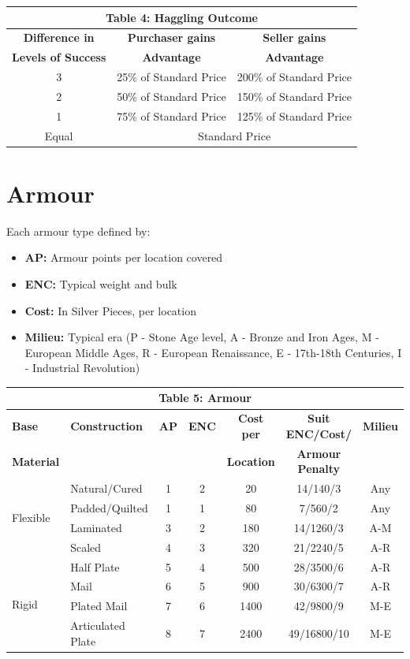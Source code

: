 \documentclass[10pt]{article}
\begin{document}
\begin{longtable}[c]{|c|c|c|}
\hline
\multicolumn{3}{|c|}{\textbf{Table 4: Haggling Outcome}} \\
\hline
\textbf{Difference in} & \textbf{Purchaser gains} & \textbf{Seller gains} \\
\textbf{Levels of Success} & \textbf{Advantage} & \textbf{Advantage} \\
\hline
3 & 25\% of Standard Price & 200\% of Standard Price \\
\hline
2 & 50\% of Standard Price & 150\% of Standard Price \\
\hline
1 & 75\% of Standard Price & 125\% of Standard Price \\
\hline
Equal & \multicolumn{2}{c|}{Standard Price} \\
\hline
\end{longtable}


\section{Armour}
\label{sec:armour}

Each armour type defined by:
\begin{itemize}
    \item \textbf{AP:} Armour points per location covered
    \item \textbf{ENC:} Typical weight and bulk 
    \item \textbf{Cost:} In Silver Pieces, per location
    \item \textbf{Milieu:} Typical era (P - Stone Age level, A - Bronze and Iron Ages, M - European Middle Ages, R - European Renaissance, E - 17th-18th Centuries, I - Industrial Revolution)
\end{itemize}

\begin{longtable}[c]{|l|l|c|c|c|c|c|}
\hline
\multicolumn{7}{|c|}{\textbf{Table 5: Armour}} \\
\hline
\textbf{Base} & \textbf{Construction} & \textbf{AP} & \textbf{ENC} & \textbf{Cost per} & \textbf{Suit ENC/Cost/} & \textbf{Milieu} \\
\textbf{Material} & & & & \textbf{Location} & \textbf{Armour Penalty} & \\
\hline
\multirow{4}{*}{Flexible} & Natural/Cured & 1 & 2 & 20 & 14/140/3 & Any \\
\cline{2-7}
 & Padded/Quilted & 1 & 1 & 80 & 7/560/2 & Any \\
\cline{2-7}
 & Laminated & 3 & 2 & 180 & 14/1260/3 & A-M \\
\cline{2-7}
 & Scaled & 4 & 3 & 320 & 21/2240/5 & A-R \\
\hline
\multirow{4}{*}{Rigid} & Half Plate & 5 & 4 & 500 & 28/3500/6 & A-R \\
\cline{2-7}
 & Mail & 6 & 5 & 900 & 30/6300/7 & A-R \\
\cline{2-7}
 & Plated Mail & 7 & 6 & 1400 & 42/9800/9 & M-E \\
\cline{2-7}
 & Articulated Plate & 8 & 7 & 2400 & 49/16800/10 & M-E \\
\hline
\end{longtable}
\end{document}
